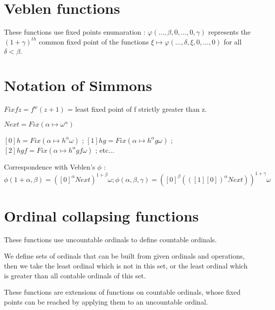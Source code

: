 \documentclass[8pt]{article}
\begin{document}
\section{Veblen functions}
\vspace{-0.4cm}
These functions use fixed points enumaration : \(\varphi(\ldots,\beta,0,\ldots,0,\gamma) \) represents the \((1+\gamma)^{th}\) common fixed point of the functions \( \xi \mapsto \varphi(\ldots,\delta,\xi,0,\ldots,0)\) for all \(\delta < \beta\).
\vspace{-0.6cm}

\section{Notation of Simmons}
\vspace{-0.4cm}
\( Fix f z = f^w(z+1)\) = least fixed point of f strictly greater than z.

\( Next = Fix (\alpha \mapsto \omega^\alpha) \) 

\( [0] h = Fix (\alpha \mapsto h^\alpha \omega) \) ;
\( [1] h g = Fix (\alpha \mapsto h^\alpha g \omega) \) ;
\( [2] h g f = Fix (\alpha \mapsto h^\alpha g f \omega) \) ; etc...

Correspondence with Veblen's \(\phi\) : \( \phi(1+\alpha,\beta) = ([0]^\alpha Next)^{1+\beta} \omega ; 
 \phi(\alpha,\beta,\gamma) = ([0]^\beta (([1] [0])^\alpha Next))^{1+\gamma} \omega \)


\vspace{-0.6cm}

\section{Ordinal collapsing functions}
\vspace{-0.4cm}
These functions use uncountable ordinals to define countable ordinals.

We define sets of ordinals that can be built from given ordinals and operations, then we take the least ordinal which is not in this set, or the least ordinal which is greater than all contable ordinals of this set.

These functions are extensions of functions on countable ordinals, whose fixed points can be reached by applying them to an uncountable ordinal.
\end{document}
